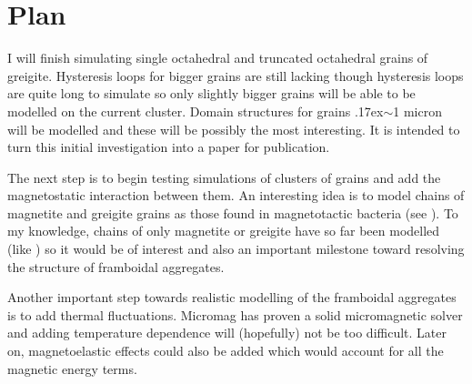 
\chapter{Plan}

\label{ch:plan}

I will finish simulating single octahedral and truncated octahedral grains of greigite. Hysteresis loops for bigger grains are still lacking though hysteresis loops are quite long to simulate so only slightly bigger grains will be able to be modelled on the current cluster. Domain structures for grains {\raise.17ex\hbox{$\scriptstyle\sim$}}1 micron will be modelled and these will be possibly the most interesting. It is intended to turn this initial investigation into a paper for publication.\par

The next step is to begin testing simulations of clusters of grains and add the magnetostatic interaction between them. An interesting idea is to model chains of magnetite and greigite grains as those found in magnetotactic bacteria (see \citet{Bazylinski}). To my knowledge, chains of only magnetite or greigite have so far been modelled (like \citet{Mxwt1}) so it would be of interest and also an important milestone toward resolving the structure of framboidal aggregates.\par

Another important step towards realistic modelling of the framboidal aggregates is to add thermal fluctuations. Micromag has proven a solid micromagnetic solver and adding temperature dependence will (hopefully) not be too difficult. Later on, magnetoelastic effects could also be added which would account for all the magnetic energy terms.